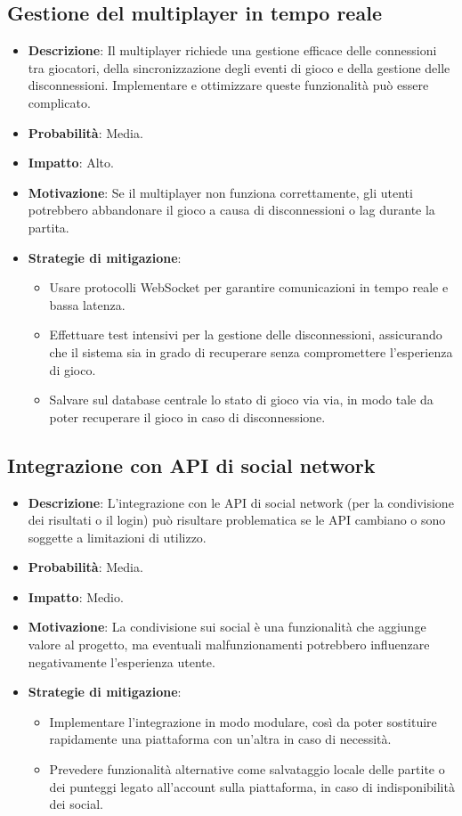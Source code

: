 \documentclass[12pt,a4paper]{report}
\begin{document}
\subsection{Gestione del multiplayer in tempo reale}
\begin{itemize}
    \item \textbf{Descrizione}: Il multiplayer richiede una gestione efficace delle connessioni tra giocatori, della sincronizzazione degli eventi di gioco e della gestione delle disconnessioni. Implementare e ottimizzare queste funzionalità può essere complicato.
    \item \textbf{Probabilità}: Media.
    \item \textbf{Impatto}: Alto.
    \item \textbf{Motivazione}: Se il multiplayer non funziona correttamente, gli utenti potrebbero abbandonare il gioco a causa di disconnessioni o lag durante la partita.
    \item \textbf{Strategie di mitigazione}:
    \begin{itemize}
        \item Usare protocolli WebSocket per garantire comunicazioni in tempo reale e bassa latenza.
        \item Effettuare test intensivi per la gestione delle disconnessioni, assicurando che il sistema sia in grado di recuperare senza compromettere l'esperienza di gioco.
        \item Salvare sul database centrale lo stato di gioco via via, in modo tale da poter recuperare il gioco in caso di disconnessione.
    \end{itemize}
\end{itemize}
\subsection{Integrazione con API di social network}
\begin{itemize}
    \item \textbf{Descrizione}:  L'integrazione con le API di social network (per la condivisione dei risultati o il login) può risultare problematica se le API cambiano o sono soggette a limitazioni di utilizzo.
    \item \textbf{Probabilità}: Media.
    \item \textbf{Impatto}: Medio.
    \item \textbf{Motivazione}: La condivisione sui social è una funzionalità che aggiunge valore al progetto, ma eventuali malfunzionamenti potrebbero influenzare negativamente l'esperienza utente.
    \item \textbf{Strategie di mitigazione}:
    \begin{itemize}
        \item Implementare l’integrazione in modo modulare, così da poter sostituire rapidamente una piattaforma con un’altra in caso di necessità.
        \item Prevedere funzionalità alternative come salvataggio locale delle partite o dei punteggi legato all’account sulla piattaforma, in caso di indisponibilità dei social.
    \end{itemize}
\end{itemize}
\end{document}

